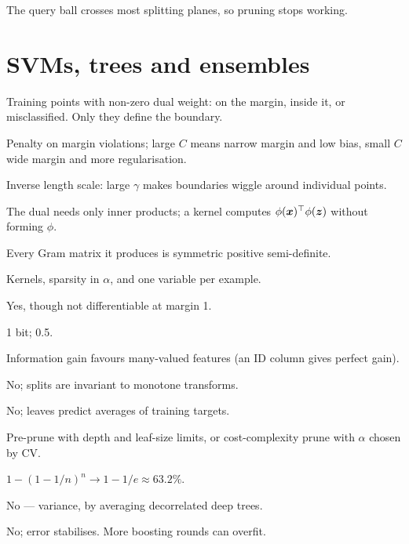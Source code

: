 {	 The query ball crosses most splitting planes, so pruning stops working.

	\section{SVMs, trees and ensembles}

	 Training points with non-zero dual weight: on the margin, inside it, or misclassified.
	Only they define the boundary.

	 Penalty on margin violations; large $C$ means narrow margin and low bias, small $C$
	wide margin and more regularisation.

	 Inverse length scale: large $\gamma$ makes boundaries wiggle around
	individual points.

	 The dual needs only inner products; a kernel computes $\phi({\bm{x}})^{\top}\phi({\bm{z}})$ without forming
	$\phi$.

	 Every Gram matrix it produces is symmetric positive semi-definite.

	 Kernels, sparsity in $\alpha$, and one variable per example.

	 Yes, though not differentiable at margin 1.

	 1 bit; 0.5.

	 Information gain favours many-valued features (an ID column gives perfect gain).

	 No; splits are invariant to monotone transforms.

	 No; leaves predict averages of training targets.

	 Pre-prune with depth and leaf-size limits, or cost-complexity prune with $\alpha$ chosen by CV.

	 $1-(1-1/n)^n\to1-1/e\approx63.2\%$.

	 No --- variance, by averaging decorrelated deep trees.

	 No; error stabilises. More boosting rounds can overfit.

}
